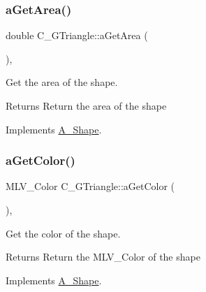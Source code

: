 \subsubsection{\texorpdfstring{a\+Get\+Area()}{aGetArea()}\hspace{0.1cm}{\footnotesize\ttfamily [2/2]}}
{\footnotesize\ttfamily double C\+\_\+\+G\+Triangle\+::a\+Get\+Area (\begin{DoxyParamCaption}{ }\end{DoxyParamCaption})\hspace{0.3cm}{\ttfamily [override]}, {\ttfamily [virtual]}}



Get the area of the shape. 

\begin{DoxyReturn}{Returns}
Return the area of the shape 
\end{DoxyReturn}


Implements \hyperlink{classA__Shape_a1b142ee2d873d6c217f65de1632e7b6e}{A\+\_\+\+Shape}.

\mbox{\label{classC__GTriangle_a19100d603f9239fd66f1115c4358f0fc}} 
\subsubsection{\texorpdfstring{a\+Get\+Color()}{aGetColor()}\hspace{0.1cm}{\footnotesize\ttfamily [1/2]}}
{\footnotesize\ttfamily M\+L\+V\+\_\+\+Color C\+\_\+\+G\+Triangle\+::a\+Get\+Color (\begin{DoxyParamCaption}{ }\end{DoxyParamCaption})\hspace{0.3cm}{\ttfamily [override]}, {\ttfamily [virtual]}}



Get the color of the shape. 

\begin{DoxyReturn}{Returns}
Return the M\+L\+V\+\_\+\+Color of the shape 
\end{DoxyReturn}


Implements \hyperlink{classA__Shape_a1e90c8132d33e4ac84d42f72606193b2}{A\+\_\+\+Shape}.

\mbox{\label{classC__GTriangle_a19100d603f9239fd66f1115c4358f0fc}} 
